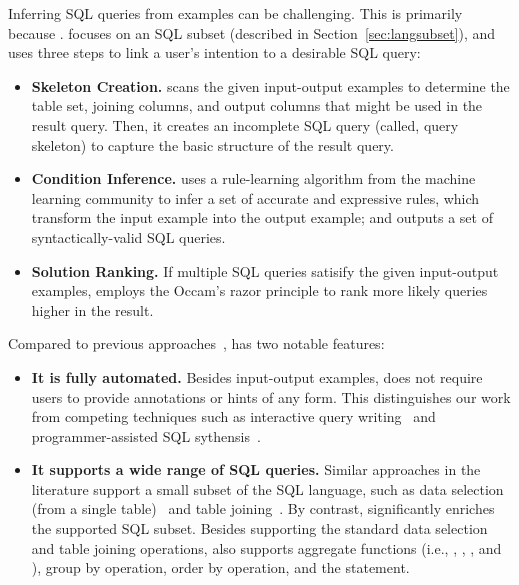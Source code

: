 Inferring SQL queries from examples can be challenging.
This is primarily because .
\ourtool focuses on an  SQL subset (described in Section~\ref{sec:langsubset}),
and uses three steps to link a user's intention to
a desirable SQL query:



\begin{itemize}
\item \textbf{Skeleton Creation.} \ourtool scans the
given input-output examples to determine the table
set, joining columns, and output columns that might
be used in the result query. Then, it creates an
incomplete SQL query (called, query skeleton) to
capture the basic structure of the result query.

\item \textbf{Condition Inference.} \ourtool
uses a rule-learning algorithm from the machine
learning community to infer a set of accurate
and expressive rules, which transform the input
example into the output example; and
outputs a set of syntactically-valid SQL
queries.


\item \textbf{Solution Ranking.} If multiple SQL
queries satisify the given input-output examples,
\ourtool employs the Occam's razor principle to
rank more likely queries higher in the result.
\end{itemize}

Compared to previous approaches~\cite{Zloof:1975,
Tran:2009, DasSarma:2010, abs-1208-2013}, \ourtool has two notable features:

\begin{itemize}
\item \textbf{It is fully automated.} Besides input-output
examples, \ourtool does not require users to provide
annotations or hints of any form. 
This distinguishes our work from competing techniques such as
interactive query writing~\cite{Zloof:1975} and
programmer-assisted SQL sythensis~\cite{abs-1208-2013}.

\item \textbf{It supports a wide range of SQL queries.}
Similar approaches in the literature support
a small subset of the SQL language, such as data selection
(from a single table)~\cite{Zloof:1975, DasSarma:2010}
and table joining~\cite{Tran:2009, DasSarma:2010, abs-1208-2013}. By contrast, 
\ourtool significantly enriches the supported SQL subset.
Besides supporting the standard data selection and table joining
operations, \ourtool also supports aggregate functions (i.e.,
, , ,
and ), group by operation,
order by operation, and the 
statement. 
\end{itemize}


